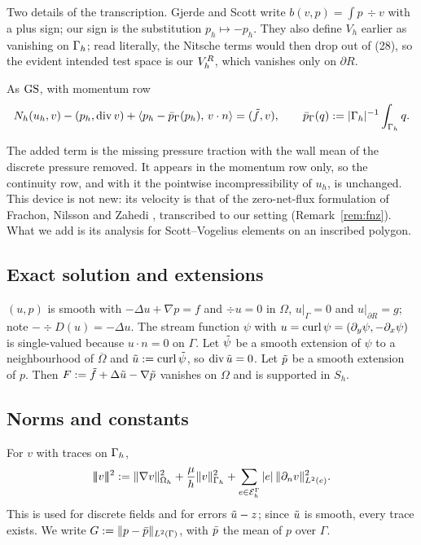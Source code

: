 Two details of the transcription. Gjerde and Scott write $b(v,p)=\int p\,\div v$ with a plus sign; our sign is the substitution $p_h\mapsto-p_h$. They also define $V_h$ earlier as vanishing on $\Gamma_h$; read literally, the Nitsche terms would then drop out of (28), so the evident intended test space is our $V_h^R$, which vanishes only on $\partial R$.

\begin{definition}\label{def:cns}
As $\mathrm{GS}$, with momentum row
\[
N_h(u_h,v)-(p_h,\operatorname{div} v)+\langle p_h-\bar p_{\Gamma}(p_h),\, v\cdot n\rangle=(\tilde f,v),\qquad \bar p_{\Gamma}(q):=|\Gamma_h|^{-1}\int_{\Gamma_h}q .
\]
\end{definition}

The added term is the missing pressure traction with the wall mean of the discrete pressure removed. It appears in the momentum row only, so the continuity row, and with it the pointwise incompressibility of $u_h$, is unchanged. This device is not new: its velocity is that of the zero-net-flux formulation of Frachon, Nilsson and Zahedi \cite{FrachonNilssonZahedi2024}, transcribed to our setting (Remark~\ref{rem:fnz}). What we add is its analysis for Scott--Vogelius elements on an inscribed polygon.

\subsection*{Exact solution and extensions}
$(u,p)$ is smooth with $-\Delta u+\nabla p=f$ and $\div u=0$ in $\Omega$, $u|_\Gamma=0$ and $u|_{\partial R}=g$; note $-\div D(u)=-\Delta u$. The stream function $\psi$ with $u=\operatorname{curl}\psi=(\partial_y\psi,-\partial_x\psi)$ is single-valued because $u\cdot n=0$ on $\Gamma$.
Let $\tilde\psi$ be a smooth extension of $\psi$ to a neighbourhood of $\overline\Omega$ and $\tilde u:=\operatorname{curl}\tilde\psi$, so $\operatorname{div}\tilde u=0$. Let $\tilde p$ be a smooth extension of $p$. Then $F:=\tilde f+\Delta\tilde u-\nabla\tilde p$ vanishes on $\Omega$ and is supported in $S_h$.

\subsection*{Norms and constants}
For $v$ with traces on $\Gamma_h$,
\[
|\!|\!|v|\!|\!|^2:=\lVert \nabla v\rVert_{\Omega_h}^2+\frac{\mu}{h}\lVert v\rVert_{\Gamma_h}^2+\sum_{e\in\mathcal E_h^\Gamma}|e|\,\lVert \partial_n v\rVert_{L^2(e)}^2 .
\]
This is used for discrete fields and for errors $\tilde u-z$; since $\tilde u$ is smooth, every trace exists. We write $G:=\lVert p-\bar p\rVert_{L^2(\Gamma)}$, with $\bar p$ the mean of $p$ over $\Gamma$.

